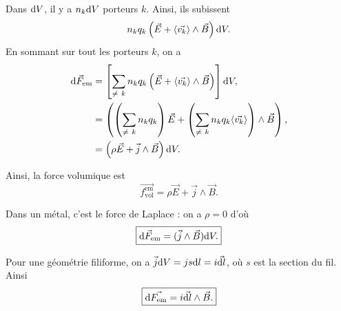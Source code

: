        Dans $\mathrm{d} V$, il y a $n_k\mathrm{d} V$ porteurs $k$. Ainsi, ils subissent
        \begin{equation}
            n_k q_k\left(\vec{E}+\langle \vec{v_k}\rangle\wedge \vec{B}\right)\mathrm{d} V.
        \end{equation}
        En sommant sur tout les porteurs $k$, on a 
        \begin{align}
            \mathrm{d}\vec{F}_{\text{em}}
            &=
            \left[
                \sum_{\neq~k}n_kq_k\left(\vec{E}+\langle\vec{v_k}\rangle\wedge\vec{B}\right)
            \right]\mathrm{d} V,\\
            &=
            \left(
                \left(\sum_{\neq~k}n_k q_k\right)\vec{E}+\left(\sum_{\neq~k}n_kq_k\langle\vec{v_k}\rangle\right)\wedge\vec{B}
            \right),\\
            &=
            \left(\rho\vec{E}+\vec{j}\wedge\vec{B}\right)\mathrm{d} V.
        \end{align}

        Ainsi, la force volumique est 
        \begin{equation}
            \boxed{
                \vec{f_{\text{vol}}^{\text{em}}}=\rho\vec{E}+\vec{j}\wedge\vec{B}.
            }
        \end{equation}

        \begin{example}
            Dans un métal, c'est le force de Laplace : on a $\rho=0$ d'où 
            \begin{equation}
                \boxed{
                    \mathrm{d}\vec{F}_{\text{em}}=(\vec{j}\wedge\vec{B})\mathrm{d} V.
                }
            \end{equation}

            Pour une géométrie filiforme, on a $\vec{j}\mathrm{d} V=js\mathrm{d} l=i\vec{\mathrm{d} l}$, où $s$ est la section du fil. Ainsi
            \begin{equation}
                \boxed{
                    \mathrm{d}\vec{F_{\text{em}}}=i\vec{\mathrm{d} l}\wedge\vec{B}.
                }
            \end{equation}
        \end{example}